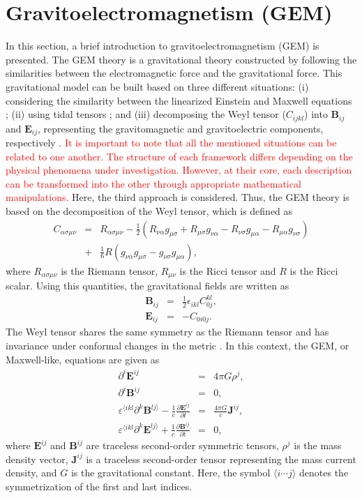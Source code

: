 \documentclass[11pt,showpacs,preprintnumbers,amsmath,amssymb,prd,nofootinbib,superscriptaddress]{revtex4-2}
\newcommand{\bea}{\begin{eqnarray}}
\newcommand{\eea}{\end{eqnarray}}
\begin{document}
 
\section{Gravitoelectromagnetism (GEM)}\label{II}

In this section, a brief introduction to gravitoelectromagnetism (GEM) is presented. The GEM theory is a gravitational theory constructed by following the similarities between the electromagnetic force and the gravitational force. This gravitational model can be built based on three different situations: (i) considering the similarity between the linearized Einstein and Maxwell equations \cite{Mashhon}; (ii) using tidal tensors \cite{Filipe}; and (iii) decomposing the  Weyl tensor  ($C_{ijkl}$) into $\mathbf{B}_{ij}$ and $\mathbf{E}_{ij}$, representing the gravitomagnetic and gravitoelectric components, respectively \cite{Maartens}. \textcolor{red}{It is important to note that all the mentioned situations can be related to one another. The structure of each framework differs depending on the physical phenomena under investigation. However, at their core, each description can be transformed into the other through appropriate mathematical manipulations.} Here, the third approach is considered. Thus, the GEM theory is based on the decomposition of the Weyl tensor, which is defined as
\bea
C_{\alpha\sigma\mu\nu}&=&R_{\alpha\sigma\mu\nu}-\frac{1}{2}\left(R_{\nu\alpha}g_{\mu\sigma}+R_{\mu\sigma}g_{\nu\alpha}-R_{\nu\sigma}g_{\mu\alpha}-R_{\mu\alpha}g_{\nu\sigma}\right)\nonumber\\
&+&\frac{1}{6}R\left(g_{\nu\alpha}g_{\mu\sigma}-g_{\nu\sigma}g_{\mu\alpha}\right),
\eea
where $R_{\alpha\sigma\mu\nu}$ is the Riemann tensor, $R_{\mu\nu}$ is the Ricci tensor and $R$ is the Ricci scalar. Using this quantities, the gravitational fields are written as
\bea
\mathbf{B}_{ij}&=&\frac{1}{2}\epsilon_{ikl}C^{kl}_{0j},\\
\mathbf{E}_{ij}&=&-C_{0i0j}.
\eea
 The Weyl tensor shares the same symmetry as the Riemann tensor and has invariance under conformal changes in the metric \cite{danehkar2009significance}. In this context, the GEM, or Maxwell-like,  equations are given as
\begin{eqnarray}
    \partial^{i}\mathbf{E}^{ij}&=&4\pi G\rho^j,\label{2.2}\\
    \partial^{i}\mathbf{B}^{ij}&=&0,\label{2.3}\\
    \varepsilon^{\langle ikl}\partial^k \mathbf{B}^{lj\rangle}-\frac{1}{c}\frac{\partial \mathbf{E}^{ij}}{\partial t}&=&\frac{4\pi G}{c}\mathbf{J}^{ij},\label{2.4}\\
    \varepsilon^{\langle ikl}\partial^k \mathbf{E}^{lj\rangle}+\frac{1}{c}\frac{\partial \mathbf{B}^{ij}}{\partial t}&=&0,\label{2.5}
\end{eqnarray}
where $\mathbf{E}^{ij}$ and $\mathbf{B}^{ij}$ are traceless second-order symmetric tensors, $\rho^j$ is the mass density vector, $\mathbf{J}^{ij}$ is a traceless second-order tensor representing the mass current density, and $G$ is the gravitational constant. Here, the symbol $\langle i\cdots j \rangle$ denotes the
symmetrization of the first and last indices.
\end{document}
